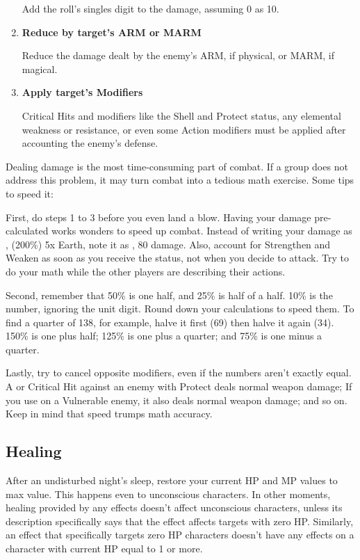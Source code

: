 \begin{multicols}{2}
\begin{enumerate}
Add the roll's singles digit to the damage, assuming 0 as 10.

\item \textbf{Reduce by target's ARM or MARM}

Reduce the damage dealt by the enemy's ARM, if physical, or MARM, if magical.

\item \textbf{Apply target's Modifiers}

Critical Hits and modifiers like the Shell and Protect status, any elemental weakness or resistance, or even some Action modifiers must be applied after accounting the enemy's defense.
\end{enumerate}

\begin{boco}
Dealing damage is the most time-consuming part of combat. If a group does not address this problem, it may turn combat into a tedious math exercise. Some tips to speed it:

First, do steps 1 to 3 before you even land a blow. Having your damage pre-calculated works wonders to speed up combat. Instead of writing your damage as , (200\%) 5x Earth, note it as , 80 damage. Also, account for Strengthen and Weaken as soon as you receive the status, not when you decide to attack. Try to do your math while the other players are describing their actions.

Second, remember that 50\% is one half, and 25\% is half of a half. 10\% is the number, ignoring the unit digit. Round down your calculations to speed them. To find a quarter of 138, for example, halve it first (69) then halve it again (34). 150\% is one plus half; 125\% is one plus a quarter; and 75\% is one minus a quarter.

Lastly, try to cancel opposite modifiers, even if the numbers aren't exactly equal. A  or Critical Hit against an enemy with Protect deals normal weapon damage; If you use  on a Vulnerable enemy, it also deals normal weapon damage; and so on. Keep in mind that speed trumps math accuracy.
\end{boco}

\subsection{Healing}\label{subsec:heal}
After an undisturbed night's sleep, restore your current HP and MP values to max value. This happens even to unconscious characters. In other moments, healing provided by any effects doesn’t affect unconscious characters, unless its description specifically says that the effect affects targets with zero HP. Similarly, an effect that specifically targets zero HP characters doesn’t have any effects on a character with current HP equal to 1 or more.
\end{multicols}

